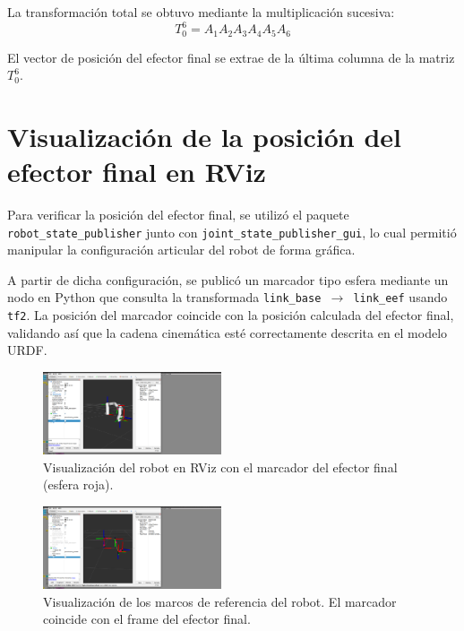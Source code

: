 \documentclass[conference]{IEEEtran}
\begin{document}
La transformación total se obtuvo mediante la multiplicación sucesiva:
\[
T_0^6 = A_1 A_2 A_3 A_4 A_5 A_6
\]

El vector de posición del efector final se extrae de la última columna de la matriz $T_0^6$.

\section{Visualización de la posición del efector final en RViz}

Para verificar la posición del efector final, se utilizó el paquete \texttt{robot\_state\_publisher} junto con \texttt{joint\_state\_publisher\_gui}, lo cual permitió manipular la configuración articular del robot de forma gráfica. 

A partir de dicha configuración, se publicó un marcador tipo esfera mediante un nodo en Python que consulta la transformada \texttt{link\_base $\rightarrow$ link\_eef} usando \texttt{tf2}. La posición del marcador coincide con la posición calculada del efector final, validando así que la cadena cinemática esté correctamente descrita en el modelo URDF.

\begin{figure}[H]
    \centering
    \includegraphics[width=0.47\textwidth]{images/robot_con_marker.png}
    \caption{Visualización del robot en RViz con el marcador del efector final (esfera roja).}
    \label{fig:rviz_marker}
\end{figure}

\begin{figure}[H]
    \centering
    \includegraphics[width=0.47\textwidth]{images/sin_robot.png}
    \caption{Visualización de los marcos de referencia del robot. El marcador coincide con el frame del efector final.}
    \label{fig:rviz_tf}
\end{figure}
\end{document}
